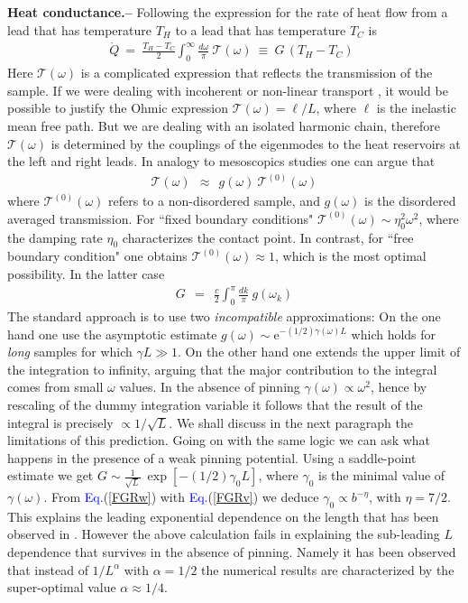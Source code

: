 \documentclass[twocolumn,showpacs,aps,pre]{revtex4-1}
\newcommand{\eexp}[1]{\mathrm{e}^{#1}}
\newcommand{\be}[1]{\begin{eqnarray} \label{e#1}}
\newcommand{\beq}{\begin{eqnarray}}
\newcommand{\eeq}{\end{eqnarray}}
\newcommand{\Eq}[1]{{\textcolor{blue}{Eq.}}(\ref{#1})}
\newcommand{\sect}[1]{{\bf #1.-- }}
\begin{document}
\sect{Heat conductance}
%
Following  \cite{D08,D01,DL08} the expression for the rate of heat flow from 
a lead that has temperature $T_H$ to a lead that has temperature $T_C$ is 
% 
\beq
\dot{Q} \ = \ 
\frac{T_H{-}T_C}{2} \int_{0}^{\infty} \frac{d\omega}{\pi} \ \mathcal{T}(\omega) 
\ \equiv \ G \, (T_H{-}T_C) \ \ 
\label{qg}
\eeq
%
Here $\mathcal{T}(\omega)$ is a complicated expression that reflects 
the transmission of the sample.  
If we were dealing with incoherent or non-linear transport \cite{dubi}, 
it would be possible to justify the Ohmic expression ${\mathcal{T}(\omega)=\ell/L}$, 
where $\ell$ is the inelastic mean free path. 
But we are dealing with an isolated harmonic chain, 
therefore ${\mathcal{T}(\omega)}$ is determined by 
the couplings of the eigenmodes to the heat reservoirs
at the left and right leads. 
In analogy to mesoscopics studies \cite{D08,D01} one can argue that
%
\beq
\mathcal{T}(\omega) \ \ \approx \ \ g(\omega) \ \mathcal{T}^{(0)}(\omega)
\eeq
%
where $\mathcal{T}^{(0)}(\omega)$ refers to a non-disordered sample, 
and $g(\omega)$ is the disordered averaged transmission. 
For ``fixed boundary conditions" ${\mathcal{T}^{(0)}(\omega)\sim \eta_0^2\omega^2}$,
where the damping rate $\eta_0$ characterizes the contact point.
In contrast, for ``free boundary condition" one obtains ${\mathcal{T}^{(0)}(\omega)\approx 1}$, 
which is the most optimal possibility. In the latter case  
%
\be{17}
G \ \ = \ \ \frac{c}{2} \int_0^{\pi} \frac{d k}{\pi} \ g(\omega_k) 
\eeq
%
The standard approach is to use two {\em incompatible} approximations:
On the one hand one use the asymptotic estimate ${g(\omega) \sim \eexp{-(1/2)\gamma(\omega) L}}$ 
which holds for {\em long} samples for which $\gamma L\gg 1$. 
On the other hand one extends the upper limit of the integration to infinity, 
arguing that the major contribution to the integral comes from small $\omega$ values.
% 
In the absence of pinning $\gamma(\omega)\propto\omega^2$, hence by rescaling 
of the dummy integration variable it follows that the result of the integral 
is precisely $\propto 1/\sqrt{L}$. 
%
We shall discuss in the next paragraph the limitations of this prediction. 
Going on with the same logic we can ask what happens in the presence of 
a weak pinning potential. Using a saddle-point estimate 
we get $G \sim  \frac{1}{\sqrt{L}} \ \exp\left[ -(1/2) \gamma_0 L \right]$, 
where $\gamma_0$ is the minimal value of $\gamma(\omega)$. 
From \Eq{FGRw} with \Eq{FGRv} we deduce $\gamma_{0} \propto b^{-\eta}$, with $\eta=7/2$.
This explains the leading exponential dependence on the length 
that has been observed in \cite{BZFK13}. 
However the above calculation fails in explaining the 
sub-leading $L$ dependence that survives in the absence of pinning.
Namely it has been observed that instead of $1/L^{\alpha}$ with $\alpha=1/2$
the numerical results are characterized by the super-optimal value ${\alpha \approx 1/4}$.  
\end{document}
